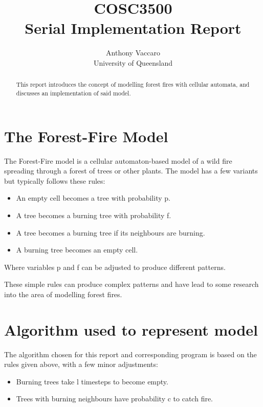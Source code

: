 \documentclass[11pt,a4paper]{article}
\begin{document}
\title{COSC3500\\Serial Implementation Report}
\author{Anthony Vaccaro\\University of Queensland}

\maketitle
\begin{abstract}
This report introduces the concept of modelling forest fires with cellular
automata, and discusses an implementation of said model.
\end{abstract}


\newpage
\section{The Forest-Fire Model}

The Forest-Fire model is a cellular automaton-based model of a wild fire
spreading through a forest of trees or other plants. The model has a few
variants but typically follows these rules:

\begin{itemize}
\item An empty cell becomes a tree with probability p.
\item A tree becomes a burning tree with probability f.
\item A tree becomes a burning tree if its neighbours are burning.
\item A burning tree becomes an empty cell.
\end{itemize}
Where variables p and f can be adjusted to produce different patterns.

These simple rules can produce complex patterns and have lead to some research
into the area of modelling forest fires.

\newpage
\section{Algorithm used to represent model}

The algorithm chosen for this report and corresponding program is based on the
rules given above, with a few minor adjustments:

\begin{itemize}
\item Burning trees take l timesteps to become empty.
\item Trees with burning neighbours have probability c to catch fire.
\end{itemize}
\end{document}
